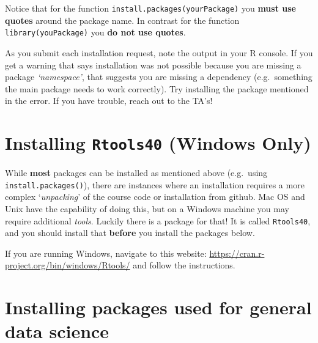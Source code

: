 \documentclass[
]{book}
\newenvironment{rmdcaution}[1]
  {
  \begin{itemize}
  \renewcommand{\labelitemi}{
    \raisebox{-.7\height}[0pt][0pt]{
      {\setkeys{Gin}{width=3em,keepaspectratio}\texttt{[image: images/\#1]}}
    }
  }
  \setlength{\fboxsep}{1em}
  \begin{caution}
  \item
  }
  {
  \end{caution}
  \end{itemize}
  }
\newenvironment{rmdnote}[1]
  {
  \begin{itemize}
  \renewcommand{\labelitemi}{
    \raisebox{-.7\height}[0pt][0pt]{
      {\setkeys{Gin}{width=3em,keepaspectratio}\texttt{[image: images/\#1]}}
    }
  }
  \setlength{\fboxsep}{1em}
  \begin{note}
  \item
  }
  {
  \end{note}
  \end{itemize}
  }
\begin{document}
\begin{rmdnote}{note}
Notice that for the function \texttt{install.packages(\textquotesingle{}yourPackage\textquotesingle{})} you \textbf{must use quotes} around the package name. In contrast for the function \texttt{library(youPackage)} you \textbf{do not use quotes}.

\end{rmdnote}

\begin{rmdcaution}{caution}
As you submit each installation request, note the output in your R console. If you get a warning that says installation was not possible because you are missing a package \emph{`namespace'}, that suggests you are missing a dependency (e.g.~something the main package needs to work correctly). Try installing the package mentioned in the error. If you have trouble, reach out to the TA's!

\end{rmdcaution}

\hypertarget{installing-rtools40-windows-only}{%
\section*{\texorpdfstring{Installing \texttt{Rtools40} (Windows Only)}{Installing Rtools40 (Windows Only)}}\label{installing-rtools40-windows-only}}

While \textbf{most} packages can be installed as mentioned above (e.g.~using \texttt{install.packages()}), there are instances where an installation requires a more complex `\emph{unpacking}' of the course code or installation from github. Mac OS and Unix have the capability of doing this, but on a Windows machine you may require additional \emph{tools}. Luckily there is a package for that! It is called \texttt{Rtools40}, and you should install that \textbf{before} you install the packages below.

If you are running Windows, navigate to this website: \url{https://cran.r-project.org/bin/windows/Rtools/} and follow the instructions.

\hypertarget{installing-packages-used-for-general-data-science}{%
\section*{Installing packages used for general data science}\label{installing-packages-used-for-general-data-science}}
\end{document}
